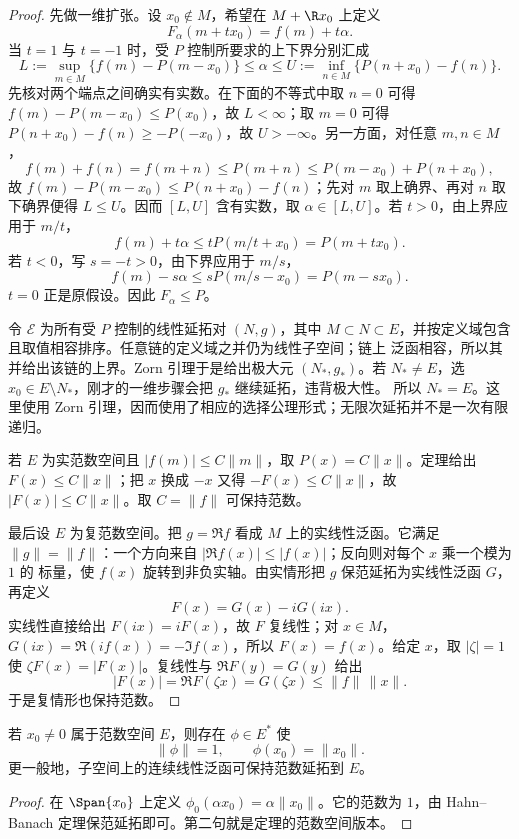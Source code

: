 \begin{proof}
先做一维扩张。设 $x_0\notin M$，希望在 $M+\R x_0$ 上定义
\[
  F_\alpha(m+tx_0)=f(m)+t\alpha.
\]
当 $t=1$ 与 $t=-1$ 时，受 $P$ 控制所要求的上下界分别汇成
\[
 L:=\sup_{m\in M}\{f(m)-P(m-x_0)\}
 \le \alpha\le
 U:=\inf_{n\in M}\{P(n+x_0)-f(n)\}.
\]
先核对两个端点之间确实有实数。在下面的不等式中取 $n=0$ 可得
$f(m)-P(m-x_0)\le P(x_0)$，故 $L<\infty$；取 $m=0$ 可得
$P(n+x_0)-f(n)\ge-P(-x_0)$，故 $U>-\infty$。另一方面，对任意 $m,n\in M$，
\[
 f(m)+f(n)=f(m+n)
 \le P(m+n)
 \le P(m-x_0)+P(n+x_0),
\]
故 $f(m)-P(m-x_0)\le P(n+x_0)-f(n)$；先对 $m$ 取上确界、再对 $n$ 取下确界便得
$L\le U$。因而 $[L,U]$ 含有实数，取 $\alpha\in[L,U]$。若 $t>0$，由上界应用于 $m/t$，
\[
 f(m)+t\alpha
 \le tP(m/t+x_0)=P(m+tx_0).
\]
若 $t<0$，写 $s=-t>0$，由下界应用于 $m/s$，
\[
 f(m)-s\alpha
 \le sP(m/s-x_0)=P(m-sx_0).
\]
$t=0$ 正是原假设。因此 $F_\alpha\le P$。

令 $\mathscr E$ 为所有受 $P$ 控制的线性延拓对 $(N,g)$，其中
$M\subset N\subset E$，并按定义域包含且取值相容排序。任意链的定义域之并仍为线性子空间；链上
泛函相容，所以其并给出该链的上界。Zorn 引理于是给出极大元 $(N_*,g_*)$。若
$N_*\ne E$，选 $x_0\in E\setminus N_*$，刚才的一维步骤会把 $g_*$ 继续延拓，违背极大性。
所以 $N_*=E$。这里使用 Zorn 引理，因而使用了相应的选择公理形式；无限次延拓并不是一次有限递归。

若 $E$ 为实范数空间且 $|f(m)|\le C\|m\|$，取 $P(x)=C\|x\|$。定理给出
$F(x)\le C\|x\|$；把 $x$ 换成 $-x$ 又得 $-F(x)\le C\|x\|$，故
$|F(x)|\le C\|x\|$。取 $C=\|f\|$ 可保持范数。

最后设 $E$ 为复范数空间。把 $g=\Re f$ 看成 $M$ 上的实线性泛函。它满足
$\|g\|=\|f\|$：一个方向来自 $|\Re f(x)|\le|f(x)|$；反向则对每个 $x$ 乘一个模为 $1$ 的
标量，使 $f(x)$ 旋转到非负实轴。由实情形把 $g$ 保范延拓为实线性泛函 $G$，再定义
\[
  F(x)=G(x)-iG(ix).
\]
实线性直接给出 $F(ix)=iF(x)$，故 $F$ 复线性；对 $x\in M$，
$G(ix)=\Re(if(x))=-\Im f(x)$，所以 $F(x)=f(x)$。给定 $x$，取 $|\zeta|=1$ 使
$\zeta F(x)=|F(x)|$。复线性与 $\Re F(y)=G(y)$ 给出
\[
 |F(x)|=\Re F(\zeta x)=G(\zeta x)
 \le\|f\|\,\|x\|.
\]
于是复情形也保持范数。
\end{proof}

\begin{corollary}[一点范数化与子空间分离]\label{corollary:3-3-3-norming}
若 $x_0\ne0$ 属于范数空间 $E$，则存在 $\phi\in E^*$ 使
\[
  \|\phi\|=1,
  \qquad \phi(x_0)=\|x_0\|.
\]
更一般地，子空间上的连续线性泛函可保持范数延拓到 $E$。
\end{corollary}

\begin{proof}
在 $\Span\{x_0\}$ 上定义 $\phi_0(\alpha x_0)=\alpha\|x_0\|$。它的范数为 $1$，由
Hahn--Banach 定理保范延拓即可。第二句就是定理的范数空间版本。
\end{proof}

